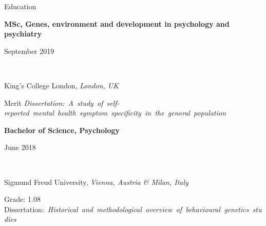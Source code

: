 \documentclass{resume2} %
\newcommand\textbox[1]{%
  \parbox{.48\textwidth}{#1}%
}
\begin{document}
\thispagestyle{plain}



\begin{rSection}{Education}



\textbox{\textbf{MSc, Genes, environment and development in psychology and psychiatry}\hfill}\textbox{\hfill September 2019}\\
\textbox{King's College London, \textit{London, UK}\hfill}{\hfill Merit}
\mbox{\small{\textit{Dissertation: A study of self-reported mental health symptom specificity in the general population}}}

\textbox{\textbf{Bachelor of Science, Psychology}\hfill}\textbox{\hfill June 2018}\\
\textbox{Sigmund Freud University, \textit{Vienna, Austria \& Milan, Italy}}{\hfill Grade: 1.08}
\mbox{\small{Dissertation: \textit{Historical and methodological overview of behavioural genetics studies}}}


\end{rSection}

\end{document}
